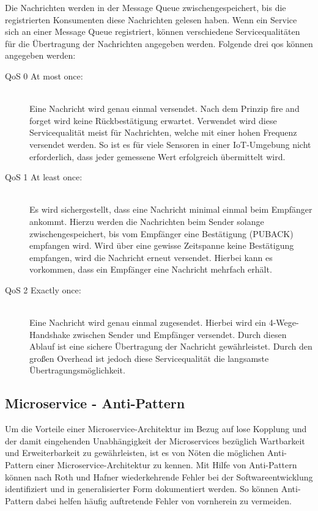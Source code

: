 Die Nachrichten werden in der Message Queue zwischengespeichert, bis die registrierten Konsumenten diese Nachrichten gelesen haben. Wenn ein Service sich an einer Message Queue registriert, können verschiedene Servicequalitäten für die Übertragung der Nachrichten angegeben werden. Folgende drei \glqq \gls{qos}\grqq{} können angegeben werden: \cite{ApacheSoftwareFoundation.2021}

\begin{description}
    \item[QoS 0 \glqq At most once\grqq{}:]\hfill \\
    Eine Nachricht wird genau einmal versendet. Nach dem Prinzip \glqq fire and forget\grqq{} wird keine Rückbestätigung erwartet. Verwendet wird diese Servicequalität meist für Nachrichten, welche mit einer hohen Frequenz versendet werden. So ist es für viele Sensoren in einer IoT-Umgebung nicht erforderlich, dass jeder gemessene Wert erfolgreich übermittelt wird.
    
    \item[QoS 1 \glqq At least once\grqq{}:]\hfill \\
    Es wird sichergestellt, dass eine Nachricht minimal einmal beim Empfänger ankommt. Hierzu werden die Nachrichten beim Sender solange zwischengespeichert, bis vom Empfänger eine Bestätigung (PUBACK) empfangen wird. Wird über eine gewisse Zeitspanne keine Bestätigung empfangen, wird die Nachricht erneut versendet. Hierbei kann es vorkommen, dass ein Empfänger eine Nachricht mehrfach erhält. \cite{FlorianRaschbichler.2017}
    
    \item[QoS 2 \glqq Exactly once\grqq{}:]\hfill \\
    Eine Nachricht wird genau einmal zugesendet. Hierbei wird ein 4-Wege-Handshake zwischen Sender und Empfänger versendet. Durch diesen Ablauf ist eine sichere Übertragung der Nachricht gewährleistet. Durch den großen Overhead ist jedoch diese Servicequalität die langsamste Übertragungsmöglichkeit.

\end{description}

\subsection{Microservice - Anti-Pattern\label{subsec2.3.2:Unterunterpunkt-2}}

Um die Vorteile einer Microservice-Architektur im Bezug auf lose Kopplung und der damit eingehenden Unabhängigkeit der Microservices bezüglich Wartbarkeit und Erweiterbarkeit zu gewährleisten, ist es von Nöten die möglichen Anti-Pattern einer Microservice-Architektur zu kennen. Mit Hilfe von Anti-Pattern können nach Roth und Hafner \cite{StephanRoth.2019} wiederkehrende Fehler bei der Softwareentwicklung identifiziert und in generalisierter Form dokumentiert werden. So können Anti-Pattern dabei helfen häufig auftretende Fehler von vornherein zu vermeiden.

